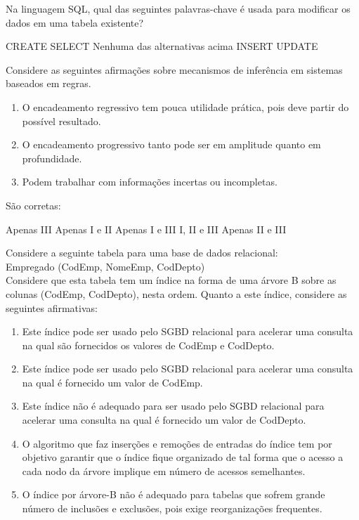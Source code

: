\documentclass[12pt, addpoints]{exam}
\begin{document}
\begin{questions}
\question
Na linguagem SQL, qual das seguintes palavras-chave é usada para modificar os
dados em uma tabela existente?

\begin{choices}
\choice CREATE
\choice SELECT
\choice Nenhuma das alternativas acima
\choice INSERT
\choice UPDATE
\end{choices}

\question
Considere as seguintes afirmações sobre mecanismos de inferência em sistemas baseados em regras.
\begin{enumerate}[label=\Roman*.]
    \item O encadeamento regressivo tem pouca utilidade prática, pois deve partir do possível resultado.
    \item O encadeamento progressivo tanto pode ser em amplitude quanto em profundidade.
    \item Podem trabalhar com informações incertas ou incompletas. 
\end{enumerate}
São corretas:
\begin{choices}
\choice Apenas III
\choice Apenas I e II
\choice Apenas I e III
\choice I, II e III
\choice Apenas II e III
\end{choices}

\question
Considere a seguinte tabela para uma base de dados relacional:\\
Empregado (CodEmp, NomeEmp, CodDepto)\\
Considere que esta tabela tem um índice na forma de uma árvore B sobre as colunas (CodEmp, CodDepto), nesta ordem.
Quanto a este índice, considere as seguintes afirmativas:
\begin{enumerate}
    \item Este índice pode ser usado pelo SGBD relacional para acelerar uma consulta na qual são fornecidos os valores de CodEmp e CodDepto.
    \item Este índice pode ser usado pelo SGBD relacional para acelerar uma consulta na qual é fornecido um valor de CodEmp.
    \item Este índice não é adequado para ser usado pelo SGBD relacional para acelerar uma consulta na qual é fornecido um valor de CodDepto.
    \item O algoritmo que faz inserções e remoções de entradas do índice tem por objetivo garantir que o índice fique organizado de tal forma que o acesso a cada nodo da árvore implique em número de acessos semelhantes.
    \item O índice por árvore-B não é adequado para tabelas que sofrem grande número de inclusões e exclusões, pois exige reorganizações frequentes.
\end{enumerate}



\end{questions}
\end{document}

